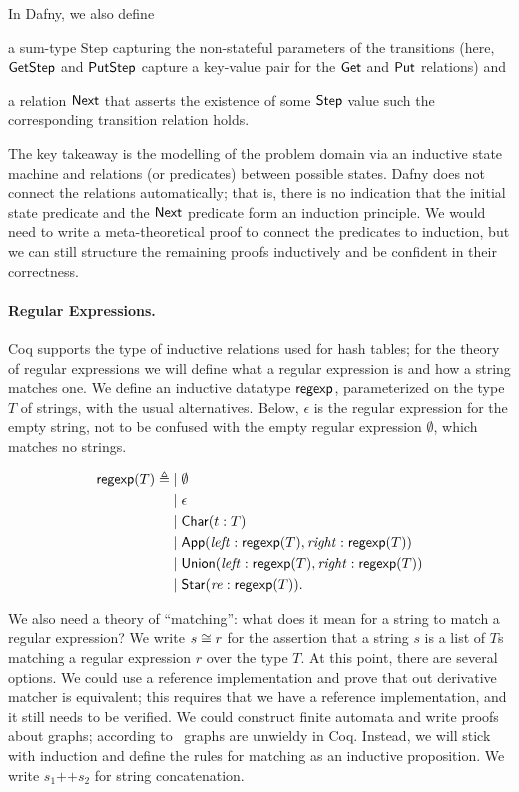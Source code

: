 In Dafny, we also define
\begin{inlist}
\item a sum-type Step capturing the non-stateful parameters of the transitions
    (here, \(\mathsf{GetStep}\) and \(\mathsf{PutStep}\) capture a key-value pair
    for the \(\mathsf{Get}\) and \(\mathsf{Put}\) relations) and
\item a relation \(\mathsf{Next}\) that asserts the existence of some
    \(\mathsf{Step}\) value such the corresponding transition relation holds.
\end{inlist}

The key takeaway is the modelling of the problem domain via an inductive state
machine and relations (or predicates) between possible states. Dafny does not
connect the relations automatically; that is, there is no indication that the
initial state predicate and the \(\mathsf{Next}\) predicate form an induction
principle. We would need to write a meta-theoretical proof to connect the
predicates to induction, but we can still structure the remaining proofs
inductively and be confident in their correctness.

\paragraph{Regular Expressions.} Coq supports the type of inductive relations
used for hash tables; for the theory of regular expressions we will define what a
regular expression is and how a string matches one. We define an inductive
datatype \(\mathsf{regexp}\), parameterized on the type \(T\) of strings, with the
usual alternatives. Below, \(\epsilon\) is the regular expression for the empty
string, not to be confused with the empty regular expression \(\emptyset\),
which matches no strings.

\begin{align*}
    \mathsf{regexp}(T) \triangleq\;
    & |\; \emptyset \\
    & |\; \epsilon \\
    & |\; \mathsf{Char}(t: T) \\
    & |\; \mathsf{App}(\mathit{left}: \mathsf{regexp}(T), \mathit{right}: \mathsf{regexp}(T)) \\
    & |\; \mathsf{Union}(\mathit{left}: \mathsf{regexp}(T), \mathit{right}: \mathsf{regexp}(T)) \\
    & |\; \mathsf{Star}(\mathit{re}: \mathsf{regexp}(T)).
\end{align*}

We also need a theory of ``matching'': what does it mean for a string to match a
regular expression? We write \(s \mathrel{\cong} r\) for the assertion that a string
\(s\) is a list of \(T\)s matching a regular expression \(r\) over the type
\(T\). At this point, there are several options. We could use a reference
implementation and prove that out derivative matcher is equivalent; this
requires that we have a reference implementation, and it still needs to be
verified. We could construct finite automata and write proofs about graphs;
according to~\cite{Morrisett_2012} graphs are unwieldy in Coq. Instead, we will
stick with induction and define the rules for matching as an inductive
proposition. We write \(s_1 \texttt{++} s_2\) for string concatenation.

